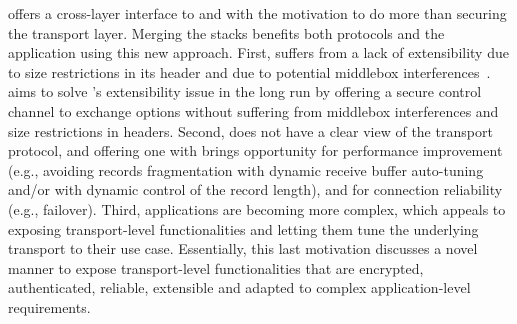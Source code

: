 

\tcpls offers a cross-layer interface to \tls and \tcp
with the motivation to do more than securing the transport layer. Merging the
stacks benefits both protocols
and the application using this new approach. First, \tcp suffers from a lack of
extensibility due to size restrictions in its header and due to
potential middlebox interferences~\cite{honda2011still}. \tcpls aims to solve
\tcp's extensibility issue in the long run by offering a secure control channel
to exchange \tcp options without suffering from middlebox interferences
and size restrictions in \tcp headers.
Second, \tls does not have a clear view of the transport protocol, and offering
one with \tcpls brings opportunity for performance improvement (e.g., avoiding
records fragmentation with dynamic receive buffer auto-tuning and/or with
dynamic control of the record length), and
for connection reliability (e.g., failover).  Third, applications are becoming
more complex, which appeals to exposing transport-level
functionalities and letting them tune the underlying transport to their use case.
Essentially, this last motivation discusses a novel manner to expose
transport-level functionalities that are encrypted, authenticated, reliable,
extensible and adapted to complex application-level requirements.


